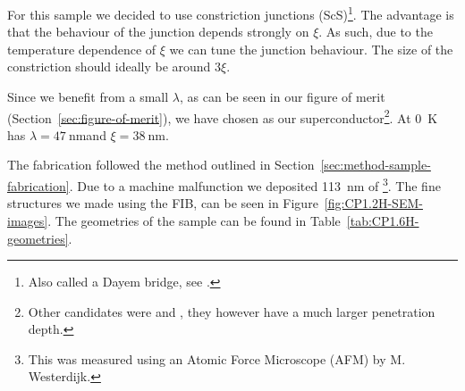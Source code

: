 For this sample we decided to use constriction junctions (ScS)\footnote{Also called a Dayem bridge, see \citeauthor{likharevSuperconductingWeakLinks1979} \citeyear{likharevSuperconductingWeakLinks1979}.}. The advantage is that the behaviour of the junction depends strongly on $\xi$\cite{likharevSuperconductingWeakLinks1979}. As such, due to the temperature dependence of $\xi$ we can tune the junction behaviour. The size of the constriction should ideally be around $3\xi$\cite{likharevSuperconductingWeakLinks1979}.

Since we benefit from a small $\lambda$, as can be seen in our figure of merit (Section~\ref{sec:figure-of-merit}), we have chosen  as our superconductor\footnote{Other candidates were  and , they however have a much larger penetration depth.}. At \qty{0}{\kelvin}  has $\lambda = \qty{47}{\nano\meter}$and $\xi = \qty{38}{\nano\meter}$\cite{maxfieldSuperconductingPenetrationDepth1965}.

The fabrication followed the method outlined in Section~\ref{sec:method-sample-fabrication}. Due to a machine malfunction we deposited \qty{113}{\nano\meter} of \footnote{This was measured using an Atomic Force Microscope (AFM) by M. Westerdijk.}. The fine structures we made using the FIB, can be seen in Figure~\ref{fig:CP1.2H-SEM-images}. The geometries of the sample can be found in Table~\ref{tab:CP1.6H-geometries}.

